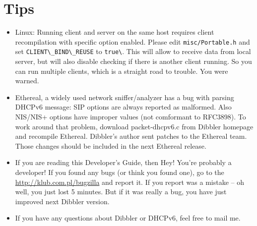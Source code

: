
\section{Tips}

\begin{itemize}
\item Linux: Running client and server on the same host requires
  client recompilation with specific option enabled. Please edit
  \verb+misc/Portable.h+ and set \verb+CLIENT\_BIND\_REUSE+ to
  \verb+true\+. This will allow to receive data from local server, but
  will also disable checking if there is another client running. So
  you can run multiple clients, which is a straight road to
  trouble. You were warned.
\item Ethereal, a widely used network sniffer/analyzer has a bug with
  parsing DHCPv6 message: SIP options are always reported as
  malformed. Also NIS/NIS+ options have improper values (not
  comformant to RFC3898). To work around that problem, download
  packet-dhcpv6.c from Dibbler homepage and recompile
  Ethereal. Dibbler's author sent patches to the Ethereal team. Those
  changes should be included in the next Ethereal release.
\item If you are reading this Developer's Guide, then Hey! You're
  probably a developer! If you found any bugs (or think you found
  one), go to the
  \href{http://klub.com.pl/bugzilla}{http://klub.com.pl/bugzilla}
   and report it. If you report was a mistake -- oh well, you just
  lost 5 minutes. But if it was really a bug, you have just improved
  next Dibbler version.
\item If you have any questions about Dibbler or DHCPv6, feel free to
  mail me.
\end{itemize}
